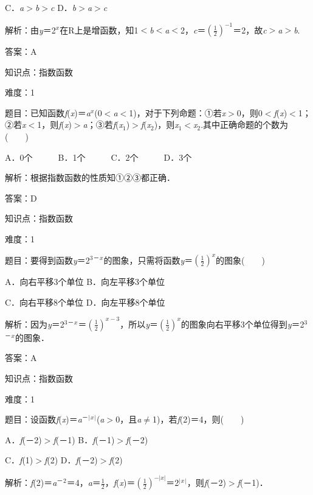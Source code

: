 \documentclass{article} %
\begin{document}
C．\textit{a}$\mathrm{>}$\textit{b}$\mathrm{>}$\textit{c}           
D．\textit{b}$\mathrm{>}$\textit{a}$\mathrm{>}$\textit{c}

解析：由\textit{y}＝2\textit{${}^{x}$}在R上是增函数，知1$\mathrm{<}$\textit{b}$\mathrm{<}$\textit{a}$\mathrm{<}$2，\textit{c}＝$(\frac{1}{2})^{-1}$＝2，故\textit{c}$\mathrm{>}$\textit{a}$\mathrm{>}$\textit{b}.

答案：A

知识点：指数函数

难度：1

题目：已知函数\textit{f}(\textit{x})＝\textit{a${}^{x}$}(0$\mathrm{<}$\textit{a}$\mathrm{<}$1)，对于下列命题：①若\textit{x}$\mathrm{>}$0，则0$\mathrm{<}$\textit{f}(\textit{x})$\mathrm{<}$1；②若\textit{x}$\mathrm{<}$1，则\textit{f}(\textit{x})$\mathrm{>}$\textit{a}；③若\textit{f}(\textit{x}${}_{1}$)$\mathrm{>}$\textit{f}(\textit{x}${}_{2}$)，则\textit{x}${}_{1}$$\mathrm{<}$\textit{x}${}_{2}$.其中正确命题的个数为(　　)

A．0个　　　B．1个　　　C．2个　　　D．3个

解析：根据指数函数的性质知①②③都正确．

答案：D

知识点：指数函数

难度：1

题目：要得到函数\textit{y}＝2${}^{3}$${}^{\textrm{－}}$\textit{${}^{x}$}的图象，只需将函数\textit{y}＝$(\frac{1}{2})^{x}$的图象(　　)

A．向右平移3个单位  B．向左平移3个单位

C．向右平移8个单位  D．向左平移8个单位

解析：因为\textit{y}＝2${}^{3}$${}^{\textrm{－}}$\textit{${}^{x}$}＝$(\frac{1}{2})^{x-3}$，所以\textit{y}＝$(\frac{1}{2})^{x}$的图象向右平移3个单位得到\textit{y}＝2${}^{3}$${}^{\textrm{－}}$\textit{${}^{x}$}的图象．

答案：A

知识点：指数函数

难度：1

题目：设函数\textit{f}(\textit{x})＝\textit{a}${}^{\textrm{－}}$${}^{|}$\textit{${}^{x}$}${}^{|}$(\textit{a}$\mathrm{>}$0，且\textit{a}$\mathrm{\neq}$1)，若\textit{f}(2)＝4，则(　　)

A．\textit{f}(－2)$\mathrm{>}$\textit{f}(－1)   B．\textit{f}(－1)$\mathrm{>}$\textit{f}(－2)

C．\textit{f}(1)$\mathrm{>}$\textit{f}(2)       D．\textit{f}(－2)$\mathrm{>}$\textit{f}(2)

解析：\textit{f}(2)＝\textit{a}${}^{\textrm{－}}$${}^{2}$＝4，\textit{a}＝$\frac{1}{2}$，\textit{f}(\textit{x})＝$(\frac{1}{2})^{-|x|}$＝2${}^{|}$\textit{${}^{x}$}${}^{|}$，则\textit{f}(－2)$\mathrm{>}$\textit{f}(－1)．
\end{document}
